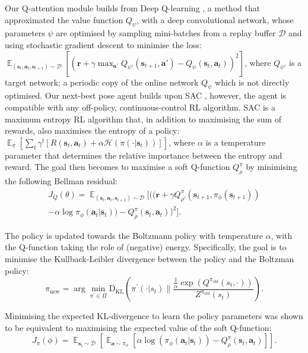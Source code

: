 \documentclass[letterpaper, 10 pt, journal, twoside]{IEEEtran}
\newcommand{\bs}{\mathbf{s}}
\newcommand{\ba}{\mathbf{a}}
\newcommand{\br}{\mathbf{r}}
\newcommand{\st}{\bs_t}
\newcommand{\at}{\ba_t}
\newcommand{\stp}{\bs_{t+1}}
\newcommand{\qcritic}{Q^{\pi}}
\newcommand{\qcriticp}{\rho}
\newcommand{\pip}{\phi}
\newcommand{\replay}{\mathcal{D}}
\DeclareMathOperator*{\E}{\mathbb{E}}
\begin{document}
Our Q-attention module builds from Deep Q-learning \cite{mnih2015human}, a method that approximated the value function $Q_\psi$, with a deep convolutional network, whose parameters $\psi$ are optimised by sampling mini-batches from a replay buffer $\replay$ and using stochastic gradient descent to minimise the loss: $\E_{(\st, \at, \stp) \sim \replay} [ (\br + \gamma \max_{\ba'}Q_{\psi'}(\stp, \ba') - Q_{\psi}(\st, \at))^2]$, where $Q_{\psi'}$ is a target network; a periodic copy of the online network $Q_\psi$ which is not directly optimised. Our next-best pose agent builds upon SAC \cite{haarnoja2018soft}, however, the agent is compatible with any off-policy, continuous-control RL algorithm. SAC is a maximum entropy RL algorithm that, in addition to maximising the sum of rewards, also maximises the entropy of a policy: $\E_\pi [ \sum_t \gamma^t [ R(\st, \at)+\alpha \mathcal{H} (\pi (\cdot | \st ) ) ] ]$, where $\alpha$ is a temperature parameter that determines the relative importance between the entropy and reward. The goal then becomes to maximise a soft Q-function $\qcritic_{\qcriticp}$ by minimising the following Bellman residual:
\begin{multline}
\label{eq:softq}
J_{Q}(\theta) = \E_{(\st, \at, \stp) \sim \replay} [ ((\br + \gamma \qcritic_{\qcriticp'}(\stp, \pi_{\pip}(\stp)) \\ - \alpha \log \pi_{\pip}(\at|\st)) - \qcritic_{\qcriticp}(\st, \at))^2].
\end{multline}

The policy is updated towards the Boltzmann policy with temperature $\alpha$, with the Q-function taking the role of (negative) energy. Specifically, the goal is to minimise the Kullback-Leibler divergence between the policy and the Boltzman policy:
\begin{equation}
\pi_{\mathrm{new}}=\arg\min_{\pi^{\prime} \in \Pi} \mathrm{D}_{\mathrm{KL}}\left(\pi^{\prime}\left(\cdot | s_t\right) \| \frac{ \frac{1}{\alpha}\exp \left(Q^{\pi_{\mathrm{old}}}\left(s_t, \cdot\right)\right)}{Z^{\pi_{\mathrm{old}}}\left(s_t\right)}\right).
\end{equation}

Minimising the expected KL-divergence to learn the policy parameters was shown to be equivalent to maximising the expected value of the soft Q-function:
\begin{equation}
\label{eq:softpi}
J_{\pi}(\pip) = \E_{\st \sim \replay} [ \E_{\ba \sim \pi_{\pip}} [ \alpha \log (\pi_{\pip} (\at | \st)) - \qcritic_{\qcriticp}(\st, \at)] ].
\end{equation}
\end{document}
